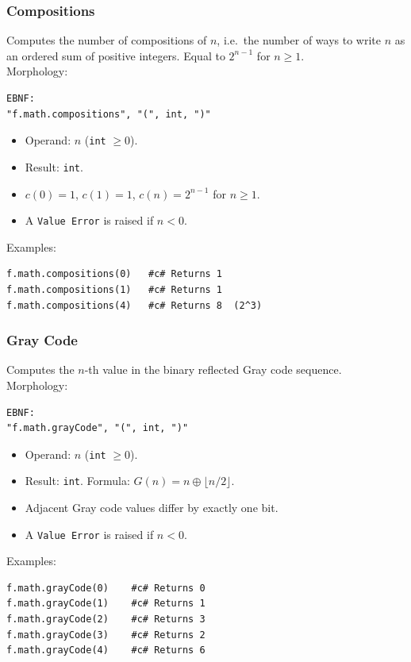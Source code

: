 \subsubsection{Compositions}
Computes the number of compositions of $n$, i.e.\ the number of ways to write $n$ as an ordered sum of positive integers. Equal to $2^{n-1}$ for $n \geq 1$. \\
Morphology:
\begin{verbatim}
EBNF:
"f.math.compositions", "(", int, ")"
\end{verbatim}
\begin{itemize}
\item Operand: $n$ (\texttt{int} $\geq 0$).
\item Result: \texttt{int}.
\item $c(0) = 1$, $c(1) = 1$, $c(n) = 2^{n-1}$ for $n \geq 1$.
\item A \texttt{Value Error} is raised if $n < 0$.
\end{itemize}
Examples:
\begin{verbatim}
f.math.compositions(0)   #c# Returns 1
f.math.compositions(1)   #c# Returns 1
f.math.compositions(4)   #c# Returns 8  (2^3)
\end{verbatim}

\subsubsection{Gray Code}
Computes the $n$-th value in the binary reflected Gray code sequence. \\
Morphology:
\begin{verbatim}
EBNF:
"f.math.grayCode", "(", int, ")"
\end{verbatim}
\begin{itemize}
\item Operand: $n$ (\texttt{int} $\geq 0$).
\item Result: \texttt{int}. Formula: $G(n) = n \oplus \lfloor n / 2 \rfloor$.
\item Adjacent Gray code values differ by exactly one bit.
\item A \texttt{Value Error} is raised if $n < 0$.
\end{itemize}
Examples:
\begin{verbatim}
f.math.grayCode(0)    #c# Returns 0
f.math.grayCode(1)    #c# Returns 1
f.math.grayCode(2)    #c# Returns 3
f.math.grayCode(3)    #c# Returns 2
f.math.grayCode(4)    #c# Returns 6
\end{verbatim}

